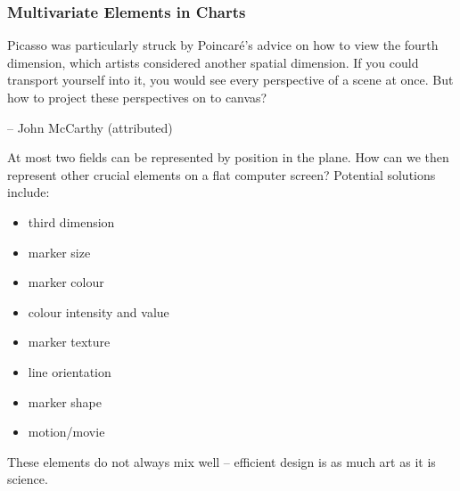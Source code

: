 \subsubsection{Multivariate Elements in Charts}
\label{appendix:datapresentation}
\begin{tcolorbox}[title=Cubism's Missing Link]
Picasso was particularly struck by Poincar\'e's advice on how to view the fourth dimension, which artists considered another spatial dimension. If you could transport yourself into it, you would see every perspective of a scene at once. But how to project these perspectives on to canvas?\\[-0.6cm]
\begin{flushright}
-- John McCarthy (attributed)
\end{flushright}
\end{tcolorbox}\noindent
At most two fields can be represented by position in the plane. How can we then represent other crucial elements on a flat computer screen? \newpage\noindent Potential solutions include: \\ \bigskip  
\begin{minipage}{\textwidth}
\begin{multicols}{2}
\begin{itemize}[noitemsep]
\item third dimension
\item marker size
\item marker colour
\item colour intensity and value 
\item marker texture
\item line orientation
\item marker shape
\item motion/movie
\end{itemize}\end{multicols}\end{minipage}\newl These elements do not always mix well -- efficient design is as much art as it is science. 

